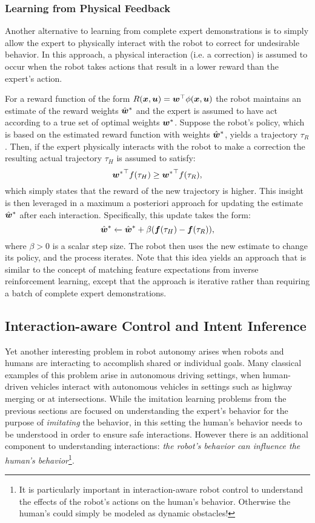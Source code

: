 \subsubsection{Learning from Physical Feedback}
Another alternative to learning from complete expert demonstrations is to simply allow the expert to physically interact with the robot to correct for undesirable behavior\cite{BajcsyLoseyEtAl2017}. In this approach, a physical interaction (i.e. a correction) is assumed to occur when the robot takes actions that result in a lower reward than the expert's action. 

For a reward function of the form $R(\bm{x}, \bm{u}) = \bm{w}^\top  \phi(\bm{x}, \bm{u})$ the robot maintains an estimate of the reward weights $\hat{\bm{w}}^*$ and the expert is assumed to have act according to a true set of optimal weights $\bm{w}^*$. Suppose the robot's policy, which is based on the estimated reward function with weights $\hat{\bm{w}}^*$, yields a trajectory $\tau_{R}$. Then, if the expert physically interacts with the robot to make a correction the resulting actual trajectory $\tau_{H}$ is assumed to satisfy:
\begin{equation*}
{\bm{w}^*}^\top f(\tau_H) \geq {\bm{w}^*}^\top f(\tau_R),
\end{equation*}
which simply states that the reward of the new trajectory is higher. This insight is then leveraged in a maximum a posteriori approach for updating the estimate $\hat{\bm{w}}^*$ after each interaction. Specifically, this update takes the form:
\begin{equation*}
\hat{\bm{w}}^* \xleftarrow{} \hat{\bm{w}}^* + \beta(\bm{f}(\tau_H) - \bm{f}(\tau_R)),
\end{equation*}
where $\beta > 0$ is a scalar step size. The robot then uses the new estimate to change its policy, and the process iterates. Note that this idea yields an approach that is similar to the concept of matching feature expectations from inverse reinforcement learning, except that the approach is iterative rather than requiring a batch of complete expert demonstrations.


\subsection{Interaction-aware Control and Intent Inference}
Yet another interesting problem in robot autonomy arises when robots and humans are interacting to accomplish shared or individual goals. Many classical examples of this problem arise in autonomous driving settings, when human-driven vehicles interact with autonomous vehicles in settings such as highway merging or at intersections. While the imitation learning problems from the previous sections are focused on understanding the expert's behavior for the purpose of \textit{imitating} the behavior, in this setting the human's behavior needs to be understood in order to ensure safe interactions. However there is an additional component to understanding interactions: \textit{the robot's behavior can influence the human's behavior}\footnote{It is particularly important in interaction-aware robot control to understand the effects of the robot's actions on the human's behavior. Otherwise the human's could simply be modeled as dynamic obstacles!}.

